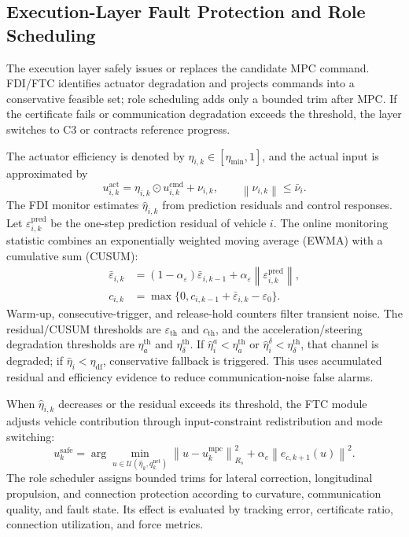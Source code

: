 \documentclass[letterpaper,journal]{IEEEtran}
\newcommand{\norm}[1]{\left\lVert #1 \right\rVert}
\begin{document}
\subsection{Execution-Layer Fault Protection and Role Scheduling}

The execution layer safely issues or replaces the candidate MPC command. FDI/FTC identifies actuator degradation and projects commands into a conservative feasible set; role scheduling adds only a bounded trim after MPC. If the certificate fails or communication degradation exceeds the threshold, the layer switches to C3 or contracts reference progress.

The actuator efficiency is denoted by $\eta_{i,k}\in[\eta_{\min},1]$, and the actual input is approximated by
\begin{equation}
u_{i,k}^{\mathrm{act}}=\eta_{i,k}\odot u_{i,k}^{\mathrm{cmd}}+\nu_{i,k},\qquad \norm{\nu_{i,k}}\le \bar\nu_i .
\label{eq:actuator_efficiency}
\end{equation}
The FDI monitor estimates $\hat\eta_{i,k}$ from prediction residuals and control responses. Let $\varepsilon_{i,k}^{\mathrm{pred}}$ be the one-step prediction residual of vehicle $i$. The online monitoring statistic combines an exponentially weighted moving average (EWMA) with a cumulative sum (CUSUM):
\begingroup\small
\begin{equation}
\begin{aligned}
\bar\varepsilon_{i,k}
&=(1-\alpha_\varepsilon)\bar\varepsilon_{i,k-1}
+\alpha_\varepsilon\norm{\varepsilon_{i,k}^{\mathrm{pred}}},\\
c_{i,k}
&=\max\{0,c_{i,k-1}+\bar\varepsilon_{i,k}-\varepsilon_0\}.
\end{aligned}
\label{eq:fdi_ewma_cusum}
\end{equation}
\endgroup
Warm-up, consecutive-trigger, and release-hold counters filter transient noise. The residual/CUSUM thresholds are $\varepsilon_{\mathrm{th}}$ and $c_{\mathrm{th}}$, and the acceleration/steering degradation thresholds are $\eta_a^{\mathrm{th}}$ and $\eta_\delta^{\mathrm{th}}$. If $\hat\eta^a_i<\eta_a^{\mathrm{th}}$ or $\hat\eta^\delta_i<\eta_\delta^{\mathrm{th}}$, that channel is degraded; if $\hat\eta_i<\eta_{\mathrm{df}}$, conservative fallback is triggered. This uses accumulated residual and efficiency evidence to reduce communication-noise false alarms.

When $\hat\eta_{i,k}$ decreases or the residual exceeds its threshold, the FTC module adjusts vehicle contribution through input-constraint redistribution and mode switching:
\begin{equation}
u_k^{\mathrm{safe}}=\arg\min_{u\in\mathcal U(\hat\eta_k,q_k^{\mathrm{net}})}
\norm{u-u_k^{\mathrm{mpc}}}_{R_s}^2+
\alpha_e\norm{e_{c,k+1}(u)}^2 .
\label{eq:ftc_projection}
\end{equation}
The role scheduler assigns bounded trims for lateral correction, longitudinal propulsion, and connection protection according to curvature, communication quality, and fault state. Its effect is evaluated by tracking error, certificate ratio, connection utilization, and force metrics.
\end{document}
